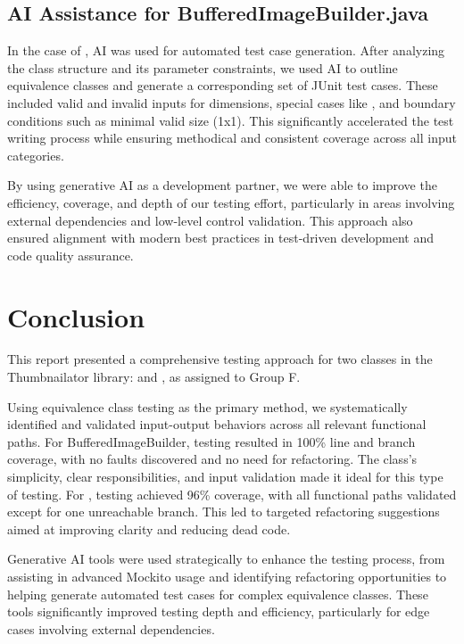 \documentclass[12pt]{article}
\begin{document}
    \markboth{}{}
    \subsection{AI Assistance for BufferedImageBuilder.java}
    \markboth{}{}

    In the case of , AI was used for automated
        test case generation.
    After analyzing the class structure and its parameter constraints, we used
        AI to outline equivalence classes and generate a corresponding set of
        JUnit test cases.
    These included valid and invalid inputs for dimensions, special cases like
        , and boundary conditions such as minimal valid size
        (1x1).
    This significantly accelerated the test writing process while ensuring
        methodical and consistent coverage across all input categories.

    By using generative AI as a development partner, we were able to improve the
        efficiency, coverage, and depth of our testing effort, particularly in
        areas involving external dependencies and low-level control validation.
    This approach also ensured alignment with modern best practices in
        test-driven development and code quality assurance.

    \section{Conclusion}

    This report presented a comprehensive testing approach for two classes in
        the Thumbnailator library:  and
        , as assigned to Group F.

    Using equivalence class testing as the primary method, we systematically
        identified and validated input-output behaviors across all relevant
        functional paths.
    For BufferedImageBuilder, testing resulted in 100\% line and
        branch coverage, with no faults discovered and no need for refactoring.
    The class's simplicity, clear responsibilities, and input validation made it
        ideal for this type of testing.
    For , testing achieved 96\%
        coverage, with all functional paths validated except for one unreachable
        branch.
    This led to targeted refactoring suggestions aimed at improving clarity and
        reducing dead code.

    Generative AI tools were used strategically to enhance the testing process,
        from assisting in advanced Mockito usage and identifying refactoring
        opportunities to helping generate automated test cases for complex
        equivalence classes.
    These tools significantly improved testing depth and efficiency,
        particularly for edge cases involving external dependencies.
\end{document}
